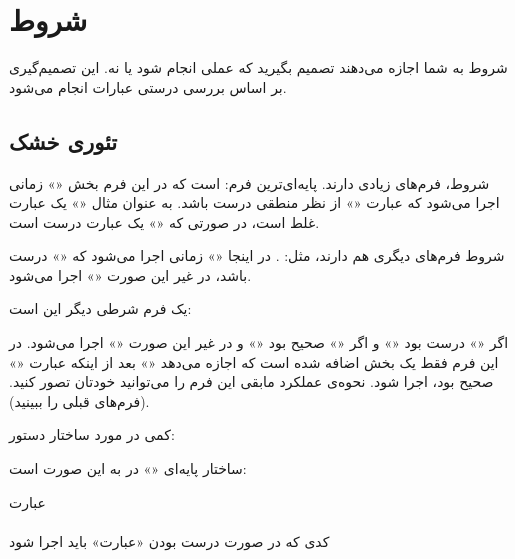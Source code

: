 \chapter{شروط}
شروط به شما اجازه می‌دهند تصمیم بگیرید که عملی انجام شود یا نه‌. این تصمیم‌گیری
بر اساس بررسی درستی عبارات انجام می‌شود‌.

\section*{تئوری خشک}
شروط، فرم‌های زیادی دارند‌. پایه‌ای‌ترین فرم‌:
است که در این فرم بخش «» زمانی اجرا می‌شود که عبارت «» از نظر منطقی
درست باشد‌. به عنوان مثال «» یک عبارت غلط است‌، در صورتی که «» یک عبارت درست
است‌.

شروط فرم‌های دیگری هم دارند‌، مثل:
.
در اینجا «» زمانی اجرا می‌شود که «» درست باشد‌‌، در غیر این
صورت «» اجرا می‌شود‌.

یک فرم شرطی دیگر این است:
\begin{flushleft}
\end{flushleft}

اگر «» درست بود «» و اگر «» صحیح بود «»
و در غیر این صورت «» اجرا می‌شود. در این فرم فقط یک بخش
 اضافه شده است که اجازه می‌دهد «» بعد از اینکه عبارت
«» صحیح بود، اجرا شود. نحوه‌ی عملکرد مابقی این فرم‌ را می‌توانید خودتان
تصور کنید. (فرم‌های قبلی را ببینید).

کمی در مورد ساختار دستور:

ساختار پایه‌ای «» در  به این صورت است‌:
\begin{flushleft}
\noindent \code{];}عبارت\code{if [} \\
\noindent {} \\
کدی که در صورت درست بودن «عبارت» باید اجرا شود\noindent \\
\noindent {}
\end{flushleft}


